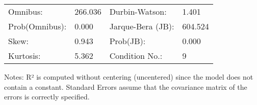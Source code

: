\begin{table}
\begin{center}
\begin{tabular}{llll}
\hline
Omnibus:       & 266.036 & Durbin-Watson:    & 1.401    \\
Prob(Omnibus): & 0.000   & Jarque-Bera (JB): & 604.524  \\
Skew:          & 0.943   & Prob(JB):         & 0.000    \\
Kurtosis:      & 5.362   & Condition No.:    & 9        \\
\hline
\end{tabular}
\end{center}
\end{table}
\bigskip
Notes: \newline 
[1] R² is computed without centering (uncentered) since the                 model does not contain a constant. \newline 
[2] Standard Errors assume that the covariance matrix of the errors is correctly specified.
